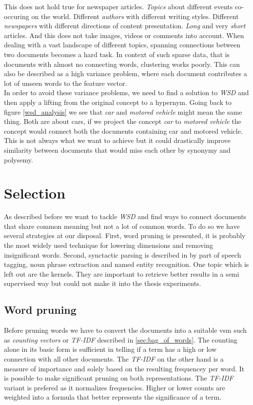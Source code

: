   This does not hold true for newspaper articles. \emph{Topics} about different events co-occuring on the world. Different \emph{authors} with different writing styles. Different \emph{newspapers} with different directions of content presentation. \emph{Long} and very \emph{short} articles. And this does not take images, videos or comments into account. When dealing with a vast landscape of different topics, spanning connections between two documents becomes a hard task. In context of such sparse data, that is documents with almost no connecting words, clustering works poorly. This can also be described as a high variance problem, where each document contributes a lot of unseen words to the feature vector.\\

  In order to avoid these variance problems, we need to find a solution to \emph{WSD} and then apply a lifting from the original concept to a hypernym. Going back to figure \ref{wsd_analysis} we see that \emph{car} and \emph{motored vehicle} might mean the same thing. Both are about cars, if we project the concept \emph{car} to \emph{motored vehicle} the concept would connect both the documents containing car and motored vehicle. This is not always what we want to achieve but it could drastically improve similarity between documents that would miss each other by synonymy and polysemy.

\section{Selection}
\label{sec:selection}

  As described before we want to tackle \emph{WSD} and find ways to connect documents that share common meaning but not a lot of common words. To do so we have several strategies at our disposal. First, word pruning is presented, it is probably the most widely used technique for lowering dimensions and removing insignificant words. Second, synctactic parsing is described in by part of speech tagging, noun phrase extraction and named entity recognition. One topic which is left out are the kernels. They are important to retrieve better results in a semi supervised way but could not make it into the thesis experiments.

  \subsection{Word pruning}
  \label{sec:word_pruning}

    Before pruning words we have to convert the documents into a suitable vsm such as \emph{counting vectors} or \emph{TF-IDF} described in \ref{sec:bag_of_words}. The counting alone in its basic form is sufficient in telling if a term has a high or low connection with all other documents. The \emph{TF-IDF} on the other hand is a measure of importance and solely based on the resulting frequencey per word. It is possible to make significant pruning on both representations. The \emph{TF-IDF} variant is prefered as it normalizes frequencies. Higher or lower counts are weighted into a formula that better represents the significance of a term.\\

